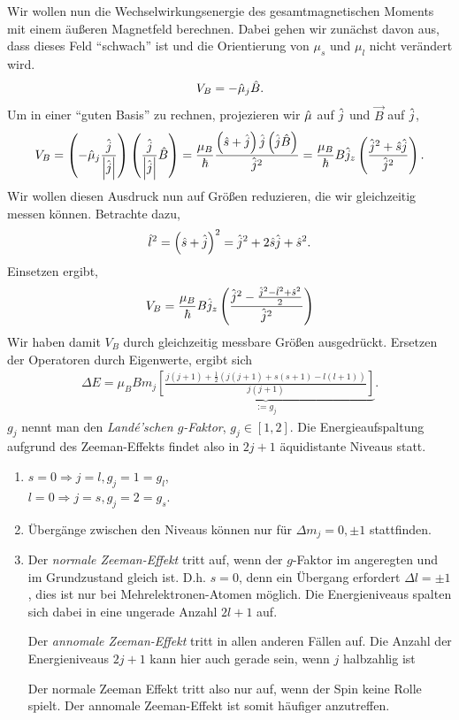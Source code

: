 Wir wollen nun die Wechselwirkungsenergie des gesamtmagnetischen Moments mit
einem äußeren Magnetfeld berechnen. Dabei gehen wir zunächst davon aus, dass
dieses Feld ``schwach'' ist und die Orientierung von $\mu_s$ und $\mu_l$ nicht
verändert wird.
\begin{align*}
V_B = -\hat{\boldmath{\mu}}_j \hat{\boldmath{B}}.
\end{align*}
Um in einer ``guten Basis'' zu rechnen, projezieren wir $\hat{\boldmath{\mu}}$ auf
$\hat{\boldmath{j}}$ und $\vec{B}$ auf $\hat{\boldmath{j}}$,
\begin{align*}
V_B
=
\left(-\hat{\boldmath{\mu}}_j\frac{\hat{\boldmath{j}}}{\left|\hat{\boldmath{j}}\right|}\right)\left(\frac{\hat{\boldmath{j}}}{\left|\hat{\boldmath{j}}\right|}\hat{\boldmath{B}}\right)
=
\frac{\mu_B}{\hbar}\frac{\left(\hat{\boldmath{s}}+\hat{\boldmath{j}}\right)\hat{\boldmath{j}}\left(\hat{\boldmath{j}}\hat{\boldmath{B}}\right)}{\hat{\boldmath{j}}^2}
= \frac{\mu_B}{\hbar} B \hat{\boldmath{j}}_z \left(\frac{\hat{\boldmath{j}}^2 +
\hat{\boldmath{s}}\hat{\boldmath{j}}}{\hat{\boldmath{j}}^2}\right).
\end{align*} 
Wir wollen diesen Ausdruck nun auf Größen reduzieren, die wir gleichzeitig
messen können. Betrachte dazu,
\begin{align*}
\hat{\boldmath{l}}^2 = \left(\hat{\boldmath{s}}+\hat{\boldmath{j}}\right)^2 = \hat{\boldmath{j}}^2 + 2\hat{\boldmath{s}}\hat{\boldmath{j}} +
\hat{\boldmath{s}}^2.
\end{align*}
Einsetzen ergibt,
\begin{align*}
V_B = \frac{\mu_B}{\hbar} B \hat{\boldmath{j}}_z \left(\frac{\hat{\boldmath{j}}^2 - \frac{\hat{\boldmath{j}}^2 -
\hat{\boldmath{l}}^2 + \hat{\boldmath{s}}^2}{2}}{\hat{\boldmath{j}}^2} \right)
\end{align*}
Wir haben damit $V_B$ durch gleichzeitig messbare Größen ausgedrückt. Ersetzen
der Operatoren durch Eigenwerte, ergibt sich
\begin{align*}
\Delta E = \mu_B B m_j \underbrace{\left[ \frac{j(j+1) + \frac{1}{2}\left(j(j+1)
+ s(s+1) - l(l+1) \right)}{j(j+1)}\right]}_{:= g_j}.
\end{align*}
$g_j$ nennt man den \emph{Landé'schen
$g$-Faktor}, $g_j\in[1,2]$.
Die Energieaufspaltung aufgrund des Zeeman-Effekts findet also in
$2j+1$ äquidistante Niveaus statt.

\begin{bemn}[Bemerkungen.]
\begin{enumerate}[label=\arabic{*}.)]
  \item $s=0\Rightarrow j=l, g_j = 1 = g_l$,\\
$l=0\Rightarrow j=s, g_j = 2 = g_s$.
\item 
Übergänge zwischen den Niveaus können nur für $\Delta m_j = 0,\pm 1$
stattfinden. 
\item
Der \emph{normale Zeeman-Effekt} tritt auf, wenn der $g$-Faktor im angeregten
und im Grundzustand gleich ist. D.h. $s=0$, denn ein Übergang erfordert
$\Delta l = \pm 1$, dies ist nur bei
Mehrelektronen-Atomen möglich. Die Energieniveaus spalten sich dabei in eine
ungerade Anzahl $2l+1$ auf.

Der \emph{annomale Zeeman-Effekt} tritt in allen anderen Fällen auf. Die
Anzahl der Energieniveaus $2j+1$ kann hier auch gerade sein, wenn $j$
halbzahlig ist

Der normale Zeeman Effekt tritt also nur auf, wenn der Spin keine Rolle
spielt. Der annomale Zeeman-Effekt ist somit häufiger anzutreffen.\maphere
\end{enumerate}
\end{bemn}
 
